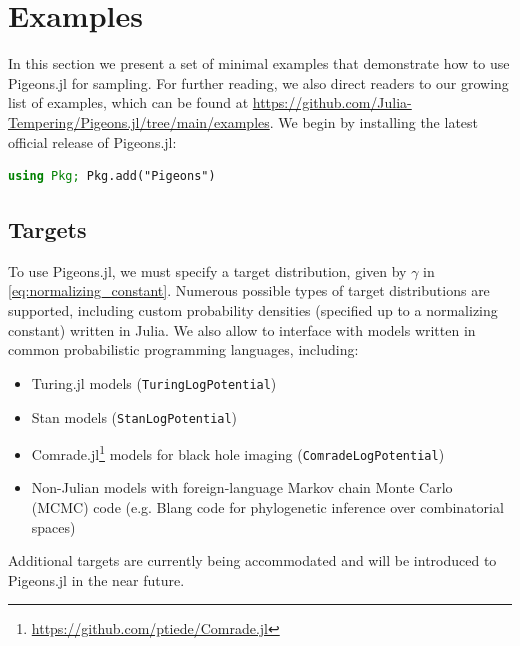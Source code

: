 \section{Examples}
In this section we present a set of minimal examples 
that demonstrate how to use Pigeons.jl for sampling. 
For further reading, we also direct readers to our growing list of examples, which can be found at 
\url{https://github.com/Julia-Tempering/Pigeons.jl/tree/main/examples}.
We begin by installing the latest official release of Pigeons.jl: 
\begin{lstlisting}[language = Julia]
using Pkg; Pkg.add("Pigeons")
\end{lstlisting}


\subsection{Targets}
To use Pigeons.jl, we must specify a target distribution, given by $\gamma$ 
in \cref{eq:normalizing_constant}.
Numerous possible types of target distributions are supported, including 
custom probability densities (specified up to a normalizing constant) written in Julia.
We also allow to interface with models written in common probabilistic programming 
languages, including:
\begin{itemize}
    \item Turing.jl \cite{ge2018turing} models (\texttt{TuringLogPotential})
    \item Stan \cite{carpenter2017stan} models (\texttt{StanLogPotential})
    \item Comrade.jl\footnote{\url{https://github.com/ptiede/Comrade.jl}} 
      models for black hole imaging (\texttt{ComradeLogPotential})
    \item Non-Julian models with foreign-language Markov chain Monte Carlo (MCMC) code 
    (e.g. Blang \cite{bouchard2022blang} code for phylogenetic inference over combinatorial spaces) 
\end{itemize}
Additional targets are currently being accommodated and will be 
introduced to Pigeons.jl in the near future.

